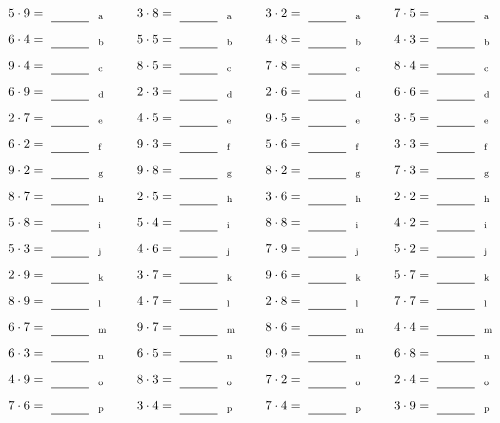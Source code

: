 \documentclass
[
  draft    = true,
  fontsize = 11pt,
  parskip  = half-
]
{scrartcl}
\begin{document}
\par\vfill\par
\begin{align*}
    \pline{5\cdot9}&=\rline{a}
  & \pline{3\cdot8}&=\rline{a}
  & \pline{3\cdot2}&=\rline{a}
  & \pline{7\cdot5}&=\rline{a} \\[1ex]
    \pline{6\cdot4}&=\rline{b}
  & \pline{5\cdot5}&=\rline{b}
  & \pline{4\cdot8}&=\rline{b}
  & \pline{4\cdot3}&=\rline{b} \\[1ex]
    \pline{9\cdot4}&=\rline{c}
  & \pline{8\cdot5}&=\rline{c}
  & \pline{7\cdot8}&=\rline{c}
  & \pline{8\cdot4}&=\rline{c} \\[1ex]
    \pline{6\cdot9}&=\rline{d}
  & \pline{2\cdot3}&=\rline{d}
  & \pline{2\cdot6}&=\rline{d}
  & \pline{6\cdot6}&=\rline{d} \\[1ex]
    \pline{2\cdot7}&=\rline{e}
  & \pline{4\cdot5}&=\rline{e}
  & \pline{9\cdot5}&=\rline{e}
  & \pline{3\cdot5}&=\rline{e} \\[1ex]
    \pline{6\cdot2}&=\rline{f}
  & \pline{9\cdot3}&=\rline{f}
  & \pline{5\cdot6}&=\rline{f}
  & \pline{3\cdot3}&=\rline{f} \\[1ex]
    \pline{9\cdot2}&=\rline{g}
  & \pline{9\cdot8}&=\rline{g}
  & \pline{8\cdot2}&=\rline{g}
  & \pline{7\cdot3}&=\rline{g} \\[1ex]
    \pline{8\cdot7}&=\rline{h}
  & \pline{2\cdot5}&=\rline{h}
  & \pline{3\cdot6}&=\rline{h}
  & \pline{2\cdot2}&=\rline{h} \\[1ex]
    \pline{5\cdot8}&=\rline{i}
  & \pline{5\cdot4}&=\rline{i}
  & \pline{8\cdot8}&=\rline{i}
  & \pline{4\cdot2}&=\rline{i} \\[1ex]
    \pline{5\cdot3}&=\rline{j}
  & \pline{4\cdot6}&=\rline{j}
  & \pline{7\cdot9}&=\rline{j}
  & \pline{5\cdot2}&=\rline{j} \\[1ex]
    \pline{2\cdot9}&=\rline{k}
  & \pline{3\cdot7}&=\rline{k}
  & \pline{9\cdot6}&=\rline{k}
  & \pline{5\cdot7}&=\rline{k} \\[1ex]
    \pline{8\cdot9}&=\rline{l}
  & \pline{4\cdot7}&=\rline{l}
  & \pline{2\cdot8}&=\rline{l}
  & \pline{7\cdot7}&=\rline{l} \\[1ex]
    \pline{6\cdot7}&=\rline{m}
  & \pline{9\cdot7}&=\rline{m}
  & \pline{8\cdot6}&=\rline{m}
  & \pline{4\cdot4}&=\rline{m} \\[1ex]
    \pline{6\cdot3}&=\rline{n}
  & \pline{6\cdot5}&=\rline{n}
  & \pline{9\cdot9}&=\rline{n}
  & \pline{6\cdot8}&=\rline{n} \\[1ex]
    \pline{4\cdot9}&=\rline{o}
  & \pline{8\cdot3}&=\rline{o}
  & \pline{7\cdot2}&=\rline{o}
  & \pline{2\cdot4}&=\rline{o} \\[1ex]
    \pline{7\cdot6}&=\rline{p}
  & \pline{3\cdot4}&=\rline{p}
  & \pline{7\cdot4}&=\rline{p}
  & \pline{3\cdot9}&=\rline{p}
\end{align*}
\end{document}
